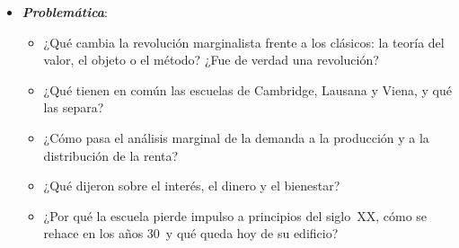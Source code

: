 \documentclass[11pt]{article}
\begin{document}
\begin{itemize}
\begin{itemize}
  \item El nombre de  lo pone  en 1900, para subrayar la continuidad de  con los clásicos\nocite{Veblen1900Preconceptions,Aspromourgos1986Neoclassical}.\footnote{ es el fundador del institucionalismo norteamericano, una escuela muy crítica con la economía de los marginalistas, a la que reprochaba su visión estática y su individuo calculador.} Después,  y  \parencite*{Stigler1941Production} lo extienden a todos los marginalistas,\footnote{ recibió el Premio Nobel en 1982 «por sus estudios pioneros de las estructuras industriales, el funcionamiento de los mercados y las causas y efectos de la regulación pública»\nocite{Nobel1982Stigler}.} que es el sentido que usamos aquí;  los llamará a todos «clásicos» .
  \end{itemize}

\item \textbf{\emph{Problemática}}:
  \begin{itemize}
  \item ¿Qué cambia la revolución marginalista frente a los clásicos: la teoría del valor, el objeto o el método? ¿Fue de verdad una revolución?
  \item ¿Qué tienen en común las escuelas de Cambridge, Lausana y Viena, y qué las separa?
  \item ¿Cómo pasa el análisis marginal de la demanda a la producción y a la distribución de la renta?
  \item ¿Qué dijeron sobre el interés, el dinero y el bienestar?
  \item ¿Por qué la escuela pierde impulso a principios del siglo~XX, cómo se rehace en los años 30~y qué queda hoy de su edificio?
  \end{itemize}


\end{itemize}
\end{document}
